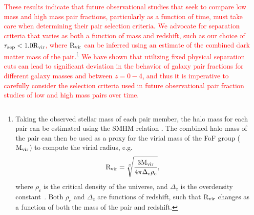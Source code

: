 \documentclass[twocolumn]{aastex631}
\newcommand{\add}[1]{\textcolor{red}{#1}}
\newcommand{\Rvir}{\ensuremath{\rm R_{vir}}}
\begin{document}

    \add{These results indicate that future observational studies that seek to compare low mass and high mass pair fractions, particularly as a function of time, must take care when determining their pair selection criteria.} 
    \add{We advocate for separation criteria that varies as both a function of mass and redshift, such as our choice of $r_{\mathrm{sep}} < 1.0\Rvir$, where $\Rvir$ can be inferred using an estimate of the combined dark matter mass of the pair.}\footnote{Taking the observed stellar mass of each pair member, the halo mass for each pair can be estimated using the SMHM relation \citep[e.g.,][]{Moster2013}. 
    The combined halo mass of the pair can then be used as a proxy for the virial mass of the FoF group ($\rm M_{vir}$) to compute the virial radius, e.g. 
    \begin{equation}\label{eq}
    \Rvir = \sqrt[3]{\frac{3\rm M_{vir}}{4\pi \Delta_{c}\rho_{c}}},
    \end{equation}
    where $\rho_c$ is the critical density of the universe, and $\Delta_{c}$ is the overdensity constant~\citep[see][]{BinneyTremaine2008}. 
    Both $\rho_c$ and $\Delta_{c}$ are functions of redshift, such that $\Rvir$ changes as a function of both the mass of the pair and redshift.}
    \add{We have shown that utilizing fixed physical separation cuts can lead to significant deviation in the behavior of galaxy pair fractions for different galaxy masses and between $z=0-4$, and thus it is imperative to carefully consider the selection criteria used in future observational pair fraction studies of low and high mass pairs over time.}
    
\end{document}
